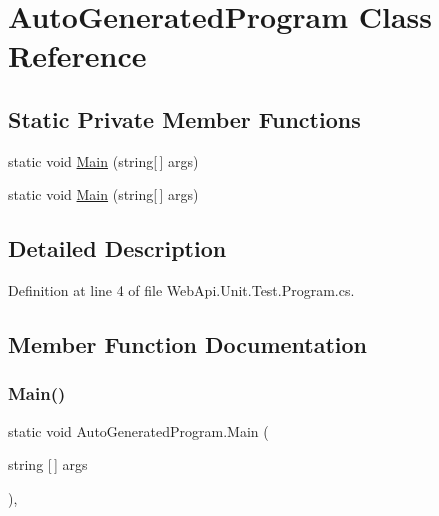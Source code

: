 \hypertarget{class_auto_generated_program}{}\section{Auto\+Generated\+Program Class Reference}
\label{class_auto_generated_program}
\subsection*{Static Private Member Functions}
\begin{DoxyCompactItemize}
\item 
static void \mbox{\hyperlink{class_auto_generated_program_a10fe504a3ffa3644fc9de3ad978c9baf}{Main}} (string\mbox{[}$\,$\mbox{]} args)
\item 
static void \mbox{\hyperlink{class_auto_generated_program_a10fe504a3ffa3644fc9de3ad978c9baf}{Main}} (string\mbox{[}$\,$\mbox{]} args)
\end{DoxyCompactItemize}


\subsection{Detailed Description}


Definition at line 4 of file Web\+Api.\+Unit.\+Test.\+Program.\+cs.



\subsection{Member Function Documentation}
\mbox{\label{class_auto_generated_program_a10fe504a3ffa3644fc9de3ad978c9baf}} 
\subsubsection{\texorpdfstring{Main()}{Main()}\hspace{0.1cm}{\footnotesize\ttfamily [1/2]}}
{\footnotesize\ttfamily static void Auto\+Generated\+Program.\+Main (\begin{DoxyParamCaption}\item[{string \mbox{[}$\,$\mbox{]}}]{args }\end{DoxyParamCaption})\hspace{0.3cm}{\ttfamily [static]}, {\ttfamily [private]}}




